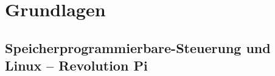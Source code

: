% 
% 
% 
% 
% 
% 
% 

\section{Grundlagen%
  \label{sec:2-grundlagen}}

\subsection{Speicherprogrammierbare-Steuerung und Linux -- Revolution Pi%
     \label{sec:2-sps}}

